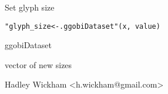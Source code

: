 \documentclass{article}
\begin{document}
\begin{Description}\relax
Set glyph size
\end{Description}
\begin{Usage}
\begin{verbatim}"glyph_size<-.ggobiDataset"(x, value)\end{verbatim}
\end{Usage}
\begin{Arguments}
\begin{ldescription}
\item[\code{x}] ggobiDataset
\item[\code{value}] vector of new sizes
\end{ldescription}
\end{Arguments}
\begin{Details}\relax
\end{Details}
\begin{Author}\relax
Hadley Wickham <h.wickham@gmail.com>
\end{Author}
\begin{SeeAlso}\relax
{}
\end{SeeAlso}
\begin{Examples}
\begin{ExampleCode}\end{ExampleCode}
\end{Examples}
\end{document}
